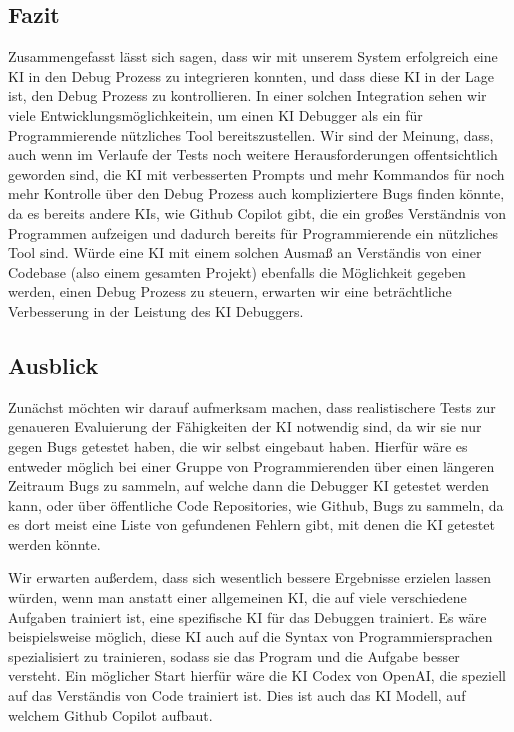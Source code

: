 \documentclass[a4paper,12pt,ngerman]{scrartcl}
\begin{document}
\subsection{Fazit}

Zusammengefasst lässt sich sagen, dass wir mit unserem System erfolgreich eine KI in den Debug Prozess zu integrieren konnten, und dass diese KI in der Lage ist, den Debug Prozess zu kontrollieren. In einer solchen Integration sehen wir viele Entwicklungsmöglichkeitein, um einen KI Debugger als ein für Programmierende nützliches Tool bereitszustellen. Wir sind der Meinung, dass, auch wenn im Verlaufe der Tests noch weitere Herausforderungen offentsichtlich geworden sind, die KI mit verbesserten Prompts und mehr Kommandos für noch mehr Kontrolle über den Debug Prozess auch kompliziertere Bugs finden könnte, da es bereits andere KIs, wie Github Copilot gibt, die ein großes Verständnis von Programmen aufzeigen und dadurch bereits für Programmierende ein nützliches Tool sind. Würde eine KI mit einem solchen Ausmaß an Verständis von einer Codebase (also einem gesamten Projekt) ebenfalls die Möglichkeit gegeben werden, einen Debug Prozess zu steuern, erwarten wir eine beträchtliche Verbesserung in der Leistung des KI Debuggers.

\subsection{Ausblick}

Zunächst möchten wir darauf aufmerksam machen, dass realistischere Tests zur genaueren Evaluierung der Fähigkeiten der KI notwendig sind, da wir sie nur gegen Bugs getestet haben, die wir selbst eingebaut haben. Hierfür wäre es entweder möglich bei einer Gruppe von Programmierenden über einen längeren Zeitraum Bugs zu sammeln, auf welche dann die Debugger KI getestet werden kann, oder über öffentliche Code Repositories, wie Github, Bugs zu sammeln, da es dort meist eine Liste von gefundenen Fehlern gibt, mit denen die KI getestet werden könnte.

Wir erwarten außerdem, dass sich wesentlich bessere Ergebnisse erzielen lassen würden, wenn man anstatt einer allgemeinen KI, die auf viele verschiedene Aufgaben trainiert ist, eine spezifische KI für das Debuggen trainiert. Es wäre beispielsweise möglich, diese KI auch auf die Syntax von Programmiersprachen spezialisiert zu trainieren, sodass sie das Program und die Aufgabe besser versteht. Ein möglicher Start hierfür wäre die KI Codex von OpenAI, die speziell auf das Verständis von Code trainiert ist. Dies ist auch das KI Modell, auf welchem Github Copilot aufbaut.
\end{document}
